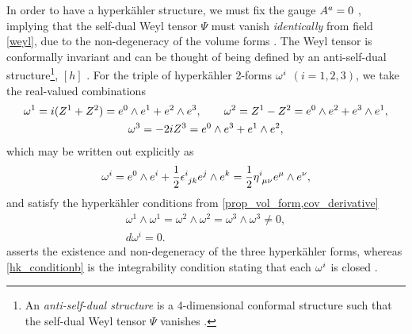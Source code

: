 \documentclass[a4paper,12pt, onecolumn, notitlepage]{article}
\theoremstyle{definition}
\theoremstyle{remark}
\newcommand{\w}{\omega}
\newcommand{\m}{\mu}
\newcommand{\n}{\nu}
\newcommand{\e}{\epsilon}
\newcommand{\HK}{hyperk\"ahler }
\newcommand{\hooft}[3]{\eta\indices{^{#1}_{#2}_{#3}}}
\begin{document}
In order to have a \HK structure, we must fix the gauge $A\indices{^a}=0$ \cite{capovilla_1991}, implying that the self-dual Weyl tensor $\Psi$ must vanish \emph{identically} from field \cref{weyl}, due to the non-degeneracy of the volume forms \cite{capovilla_1993}. The Weyl tensor is conformally invariant and can be thought of being defined by an anti-self-dual structure\footnote{An \emph{anti-self-dual structure} is a 4-dimensional conformal structure such that the self-dual Weyl tensor $\Psi$ vanishes \cite{solitons}.}, $[h]$ \cite{solitons}.
For the triple of \HK 2-forms $\w\indices{^i}$ $(i=1,2,3)$, we take the real-valued combinations
\begin{gather*}
\w\indices{^1} = i(Z^{1}+Z^{2}) = e^{0}\wedge e^{1}+e^{2}\wedge e^{3},\qquad \w\indices{^2}= Z^{1}-Z^{2}=e^{0}\wedge e^{2}+e^{3}\wedge e^{1},\\\w\indices{^3} = -2iZ\indices{^3}=e^{0}\wedge e^{3}+e^{1}\wedge e^{2},
\end{gather*}
which may be written out explicitly as
\begin{equation}
	\label{sd_form}
	\w^{i} = e^{0}\wedge e^{i} + \frac{1}{2}\e\indices{^i_j_k}e^{j}\wedge e^{k} = \frac{1}{2}\hooft{i}{\m}{\n}e^{\m}\wedge e^{\n},
\end{equation}
and satisfy the \HK conditions from  \cref{prop_vol_form,cov_derivative} 
\begin{subequations}
	\begin{gather}
	\label{hk_conditiona}
	\w^{1}\wedge\w^{1} = \w^{2}\wedge\w^{2} =\w^{3}\wedge\w^{3} \neq 0,\\
	\label{hk_conditionb}
	d\w^{i} = 0. 
	\end{gather}
\end{subequations}
 asserts the existence and non-degeneracy of the three \HK forms, whereas \cref{hk_conditionb} is the integrability condition stating that each $\w\indices{^i}$ is closed \cite{solitons}.\\
\end{document}
